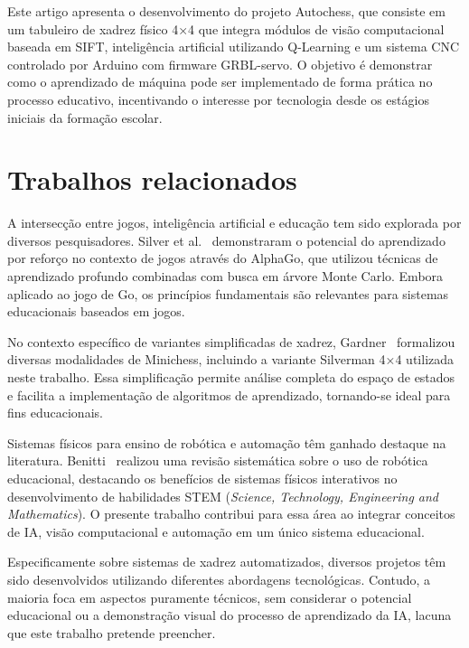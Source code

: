 \documentclass[a4paper]{ifacconf}
\begin{document}
\par\noindent Este artigo apresenta o desenvolvimento do projeto Autochess, que consiste em um tabuleiro de xadrez físico 4×4 que integra módulos de visão computacional baseada em SIFT, inteligência artificial utilizando Q-Learning e um sistema CNC controlado por Arduino com firmware GRBL-servo. O objetivo é demonstrar como o aprendizado de máquina pode ser implementado de forma prática no processo educativo, incentivando o interesse por tecnologia desde os estágios iniciais da formação escolar.

\section{Trabalhos relacionados}

\par\noindent A intersecção entre jogos, inteligência artificial e educação tem sido explorada por diversos pesquisadores. Silver et al.~\cite{silver2016alphago} demonstraram o potencial do aprendizado por reforço no contexto de jogos através do AlphaGo, que utilizou técnicas de aprendizado profundo combinadas com busca em árvore Monte Carlo. Embora aplicado ao jogo de Go, os princípios fundamentais são relevantes para sistemas educacionais baseados em jogos.

\par\noindent No contexto específico de variantes simplificadas de xadrez, Gardner~\cite{gardner1981minichess} formalizou diversas modalidades de Minichess, incluindo a variante Silverman 4×4 utilizada neste trabalho. Essa simplificação permite análise completa do espaço de estados e facilita a implementação de algoritmos de aprendizado, tornando-se ideal para fins educacionais.

\par\noindent Sistemas físicos para ensino de robótica e automação têm ganhado destaque na literatura. Benitti~\cite{benitti2012exploring} realizou uma revisão sistemática sobre o uso de robótica educacional, destacando os benefícios de sistemas físicos interativos no desenvolvimento de habilidades STEM (\textit{Science, Technology, Engineering and Mathematics}). O presente trabalho contribui para essa área ao integrar conceitos de IA, visão computacional e automação em um único sistema educacional.

\par\noindent Especificamente sobre sistemas de xadrez automatizados, diversos projetos têm sido desenvolvidos utilizando diferentes abordagens tecnológicas. Contudo, a maioria foca em aspectos puramente técnicos, sem considerar o potencial educacional ou a demonstração visual do processo de aprendizado da IA, lacuna que este trabalho pretende preencher.
\end{document}
